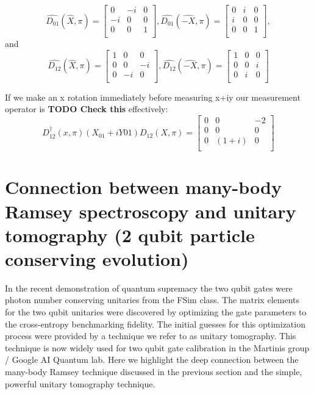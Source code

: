 {\begin{equation}
    \hat{D_{01}}(\hat{X}, \pi)=
    \begin{bmatrix}
        0  & -i & 0 \\
        -i & 0 & 0 \\
        0  & 0 & 1 \\
    \end{bmatrix},
    \hat{D_{01}}(\hat{-X}, \pi)=
    \begin{bmatrix}
        0  & i & 0 \\
        i & 0 & 0 \\
        0  & 0 & 1 \\
    \end{bmatrix},
\end{equation}
and
\begin{equation}
    \hat{D_{12}}(\hat{X}, \pi)=
    \begin{bmatrix}
        1 & 0 & 0 \\
        0 & 0 & -i \\
        0 & -i & 0 \\
    \end{bmatrix},
    \hat{D_{12}}(\hat{-X}, \pi)=
    \begin{bmatrix}
        1 & 0 & 0 \\
        0 & 0 & i \\
        0 & i & 0 \\
    \end{bmatrix}
\end{equation}

If we make an x rotation immediately before measuring x+iy our measurement operator is \textbf{TODO Check this} effectively:
\begin{equation}
    D_{12}^{\dagger}(x,\pi)(X_{01}+iY{01})D_{12}(X,\pi) =
    \begin{bmatrix}
        0 & 0 & -2 \\
        0 & 0 & 0 \\
        0 & (1+i) & 0 \\
    \end{bmatrix}
\end{equation}
} %

\section{ Connection between many-body Ramsey spectroscopy and unitary tomography (2 qubit particle conserving evolution)}
In the recent demonstration of quantum supremacy \cite{Arute2019} the two qubit gates were photon number conserving unitaries from the FSim class.
The matrix elements for the two qubit unitaries were discovered by optimizing the gate parameters to the cross-entropy benchmarking fidelity.
The initial guesses for this optimization process were provided by a technique we refer to as unitary tomography.
This technique is now widely used for two qubit gate calibration in the Martinis group / Google AI Quantum lab.
Here we highlight the deep connection between the many-body Ramsey technique discussed in the previous section and the simple, powerful unitary tomography technique.

